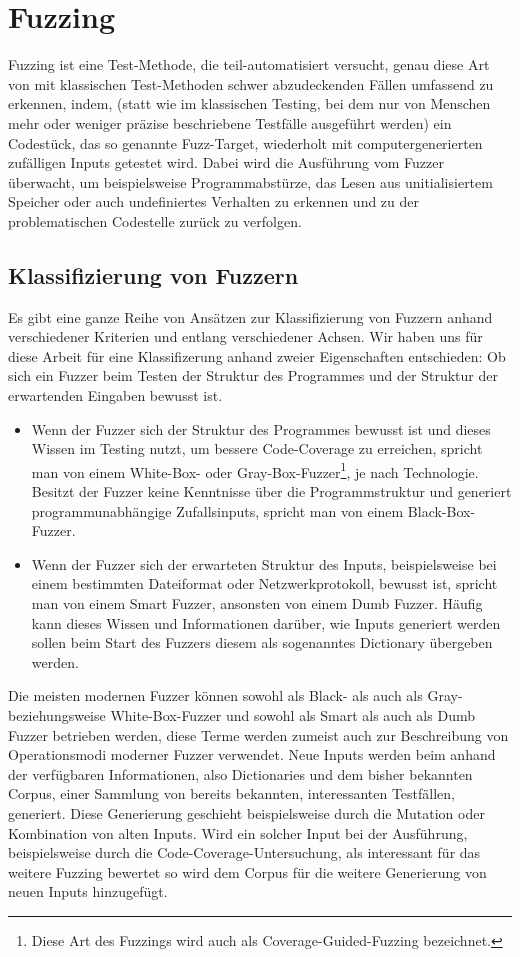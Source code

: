 \documentclass[a4paper]{article}
\begin{document}
\section{Fuzzing}
Fuzzing ist eine Test-Methode, die teil-automatisiert versucht, genau diese Art von mit klassischen Test-Methoden schwer abzudeckenden Fällen umfassend zu erkennen, indem, (statt wie im klassischen Testing, bei dem nur von Menschen mehr oder weniger präzise beschriebene Testfälle ausgeführt werden) ein Codestück, das so genannte Fuzz-Target, wiederholt mit computergenerierten zufälligen Inputs getestet wird. 
Dabei wird die Ausführung vom Fuzzer überwacht, um beispielsweise Programmabstürze, das Lesen aus unitialisiertem Speicher oder auch undefiniertes Verhalten zu erkennen und zu der problematischen Codestelle zurück zu verfolgen.

\subsection{Klassifizierung von Fuzzern}
Es gibt eine ganze Reihe von Ansätzen zur Klassifizierung von Fuzzern anhand verschiedener Kriterien und entlang verschiedener Achsen. Wir haben uns für diese Arbeit für eine Klassifizerung anhand zweier Eigenschaften entschieden: Ob sich ein Fuzzer beim Testen der Struktur des Programmes und der Struktur der erwartenden Eingaben bewusst ist.
\begin{itemize}
    \item Wenn der Fuzzer sich der Struktur des Programmes bewusst ist und dieses Wissen im Testing nutzt, um bessere Code-Coverage zu erreichen, spricht man von einem White-Box- oder Gray-Box-Fuzzer\footnote{Diese Art des Fuzzings wird auch als Coverage-Guided-Fuzzing bezeichnet.}, je nach Technologie.
        Besitzt der Fuzzer keine Kenntnisse über die Programmstruktur und generiert programmunabhängige Zufallsinputs, spricht man von einem Black-Box-Fuzzer.
    \item Wenn der Fuzzer sich der erwarteten Struktur des Inputs, beispielsweise bei einem bestimmten Dateiformat oder Netzwerkprotokoll, bewusst ist, spricht man von einem Smart Fuzzer, ansonsten von einem Dumb Fuzzer. Häufig kann dieses Wissen und Informationen darüber, wie Inputs generiert werden sollen beim Start des Fuzzers diesem als sogenanntes Dictionary übergeben werden.
\end{itemize}
Die meisten modernen Fuzzer können sowohl als Black- als auch als Gray- beziehungsweise White-Box-Fuzzer und sowohl als Smart als auch als Dumb Fuzzer betrieben werden, diese Terme werden zumeist auch zur Beschreibung von Operationsmodi moderner Fuzzer verwendet. 
Neue Inputs werden beim anhand der verfügbaren Informationen, also Dictionaries und dem bisher bekannten Corpus, einer Sammlung von bereits bekannten, interessanten Testfällen, generiert. 
Diese Generierung geschieht beispielsweise durch die Mutation oder Kombination von alten Inputs.
Wird ein solcher Input bei der Ausführung, beispielsweise durch die Code-Coverage-Untersuchung, als interessant für das weitere Fuzzing bewertet so wird dem Corpus für die weitere Generierung von neuen Inputs hinzugefügt.
\end{document}
